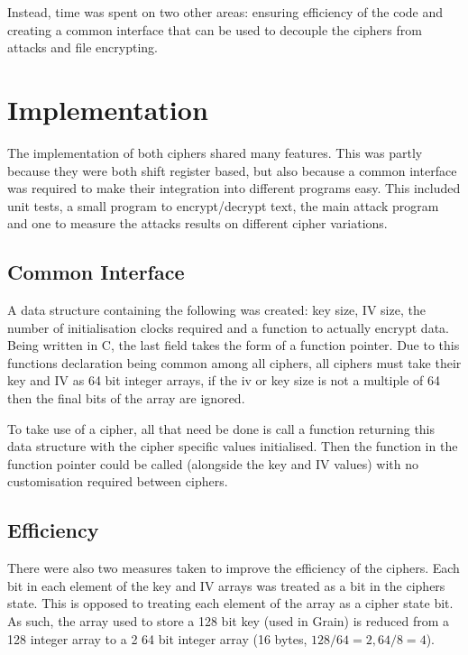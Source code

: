\documentclass{report}
\let\Oldsection\section
\renewcommand{\section}{\FloatBarrier\Oldsection}
\let\Oldsubsection\subsection
\renewcommand{\subsection}{\FloatBarrier\Oldsubsection}
\begin{document}
Instead, time was spent on two other areas: ensuring efficiency of the code and creating a common interface that can be used to decouple the ciphers from attacks and file encrypting.%

\section{Implementation}
The implementation of both ciphers shared many features. This was partly because they were both shift register based, but also because a common interface was required to make their integration into different programs easy. This included unit tests, a small program to encrypt/decrypt text, the main attack program and one to measure the attacks results on different cipher variations.

\subsection{Common Interface}
A data structure containing the following was created: key size, IV size, the number of initialisation clocks required and a function to actually encrypt data. Being written in C, the last field takes the form of a function pointer. Due to this functions declaration being common among all ciphers, all ciphers must take their key and IV as 64 bit integer arrays, if the iv or key size is not a multiple of 64 then the final bits of the array are ignored.

To take use of a cipher, all that need be done is call a function returning this data structure with the cipher specific values initialised. Then the function in the function pointer could be called (alongside the key and IV values) with no customisation required between ciphers.

\subsection{Efficiency}

There were also two measures taken to improve the efficiency of the ciphers. Each bit in each element of the key and IV arrays was treated as a bit in the ciphers state. This is opposed to treating each element of the array as a cipher state bit. As such, the array used to store a 128 bit key (used in Grain) is reduced from a 128 integer array to a 2 64 bit integer array (16 bytes, $128/64 = 2, 64/8=4$).

\begin{figure}[!htb]
\end{figure}
\end{document}
